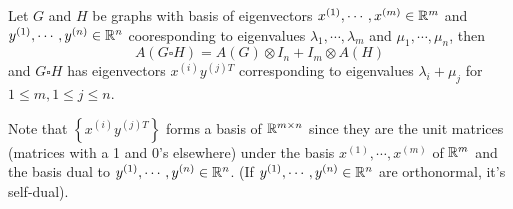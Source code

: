 \begin{corollary}
Let \(G\) and \(H\) be graphs with basis of eigenvectors \(x^{(1)},\cdots,x^{(m)}\in\mathbb{R}^m\) and \(y^{(1)},\cdots,y^{(n)}\in\mathbb{R}^n\) cooresponding to eigenvalues \(\lambda_1,\cdots,\lambda_m\) and \(\mu_1,\cdots,\mu_n\), then
\[ A(G\square H)=A(G)\otimes I_n + I_m\otimes A(H) \]
and \(G\square H\) has eigenvectors \(x^{(i)}y^{(j)T}\) corresponding to eigenvalues \(\lambda_i+\mu_j\) for \(1\leq m,1\leq j\leq n\).
\end{corollary}
\begin{remark}
Note that \(\left\{x^{(i)}y^{(j)T}\right\}\) forms a basis of \(\mathbb{R}^{m\times n}\) since they are the unit matrices (matrices with a 1 and 0's elsewhere) under the basis \(x^{(1)},\cdots,x^{(m)}\) of \(\mathbb{R}^m\) and the basis dual to \(y^{(1)},\cdots,y^{(n)}\in\mathbb{R}^n\).
(If \(y^{(1)},\cdots,y^{(n)}\in\mathbb{R}^n\) are orthonormal, it's self-dual).
\end{remark}